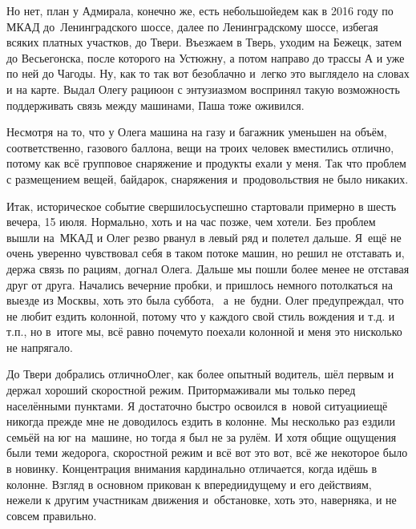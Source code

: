 Но нет, план у Адмирала, конечно же, есть небольшой\mdash едем как в 2016 году по МКАД до~Ленинградского шоссе, далее по Ленинградскому шоссе, избегая всяких платных участков, до Твери. Въезжаем в Тверь, уходим на Бежецк, затем до Весьегонска, после которого на Устюжну, а потом направо до трассы А и уже по ней до Чагоды. Ну, как то так вот безоблачно и~легко это выглядело на словах и на карте. Выдал Олегу рацию\mdash он с энтузиазмом воспринял такую возможность поддерживать связь между машинами, Паша тоже оживился. 

Несмотря на то, что у Олега машина на газу и багажник уменьшен на объём, соответственно, газового баллона, вещи на троих человек вместились отлично, потому как всё групповое снаряжение и продукты ехали у меня. Так что проблем с размещением вещей, байдарок, снаряжения и~продовольствия не было никаких.

Итак, историческое событие свершилось\mdash успешно стартовали примерно в шесть вечера, 15 июля. Нормально, хоть и на час позже, чем хотели. Без проблем вышли на~МКАД и Олег резво рванул в левый ряд и полетел дальше. Я~ещё не очень уверенно чувствовал себя в таком потоке машин, но решил не отставать и, держа связь по рациям, догнал Олега. Дальше мы пошли более менее не отставая друг от друга. Начались вечерние пробки, и пришлось немного потолкаться на выезде из Москвы, хоть это была суббота, ~а~не~будни. Олег предупреждал, что не любит ездить колонной, потому что у каждого свой стиль вождения и т.д. и т.п., но в~итоге мы, всё равно почему\sdash то поехали колонной и меня это нисколько не напрягало.

До Твери добрались отлично\mdash Олег, как более опытный водитель, шёл первым и держал хороший скоростной режим. Притормаживали мы только перед населёнными пунктами. %
Я достаточно быстро освоился в~новой ситуации\mdash ещё никогда прежде мне не доводилось ездить в колонне. Мы несколько раз ездили семьёй на юг на~машине, но тогда я был не за рулём. И хотя общие ощущения были теми же\mdash дорога, скоростной режим и всё вот это вот, всё же некоторое было в новинку. Концентрация внимания кардинально отличается, когда идёшь в колонне. Взгляд в основном прикован к впередиидущему и его действиям, нежели к другим участникам движения и~обстановке, хоть это, наверняка, и не совсем правильно. 

